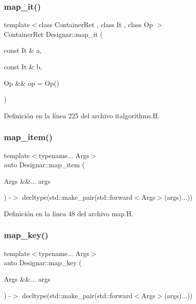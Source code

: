 \mbox{\label{namespace_designar_af22321d9c71f1bfa82df1e71f779dc86}} 
\subsubsection{\texorpdfstring{map\+\_\+it()}{map\_it()}\hspace{0.1cm}{\footnotesize\ttfamily [2/2]}}
{\footnotesize\ttfamily template$<$class Container\+Ret , class It , class Op $>$ \\
Container\+Ret Designar\+::map\+\_\+it (\begin{DoxyParamCaption}\item[{const It \&}]{a,  }\item[{const It \&}]{b,  }\item[{Op \&\&}]{op = {\ttfamily Op()} }\end{DoxyParamCaption})}



Definición en la línea 225 del archivo italgorithms.\+H.

\mbox{\label{namespace_designar_a1a0ef2d0cfea5299ec7b7ecf420665f2}} 
\subsubsection{\texorpdfstring{map\+\_\+item()}{map\_item()}}
{\footnotesize\ttfamily template$<$typename... Args$>$ \\
auto Designar\+::map\+\_\+item (\begin{DoxyParamCaption}\item[{Args \&\&...}]{args }\end{DoxyParamCaption}) -\/$>$ decltype(std\+::make\+\_\+pair(std\+::forward$<$Args$>$(args)...))
  }



Definición en la línea 48 del archivo map.\+H.

\mbox{\label{namespace_designar_ae056f21d6632882d928c2452439836c9}} 
\subsubsection{\texorpdfstring{map\+\_\+key()}{map\_key()}}
{\footnotesize\ttfamily template$<$typename... Args$>$ \\
auto Designar\+::map\+\_\+key (\begin{DoxyParamCaption}\item[{Args \&\&...}]{args }\end{DoxyParamCaption}) -\/$>$ decltype(std\+::make\+\_\+pair(std\+::forward$<$Args$>$(args)...))
  }



